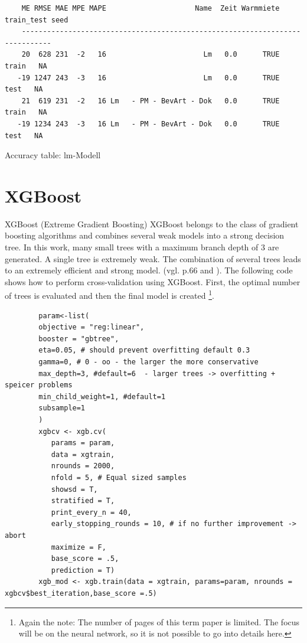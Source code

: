 	\begin{table}[H]
		\begin{verbatim}
    ME RMSE MAE MPE MAPE                     Name  Zeit Warmmiete train_test seed
    -----------------------------------------------------------------------------
    20  628 231  -2   16                       Lm   0.0      TRUE      train   NA
   -19 1247 243  -3   16                       Lm   0.0      TRUE       test   NA
    21  619 231  -2   16 Lm   - PM - BevArt - Dok   0.0      TRUE      train   NA
   -19 1234 243  -3   16 Lm   - PM - BevArt - Dok   0.0      TRUE       test   NA	
		\end{verbatim}
	\caption{Accuracy table: lm-Modell}
	\label{tbl: lm-Modell}
	\end{table}
	
	\section{XGBoost} \label{subsec: xg}
	XGBoost (Extreme Gradient Boosting) XGBoost belongs to the class of gradient boosting algorithms and combines several weak models into a strong decision tree. In this work, many small trees with a maximum branch depth of 3 are generated. A single tree is extremely weak. The combination of several trees leads to an extremely efficient and strong model.  (vgl. \cite{Data Science Solutions with Python} p.66 and \cite{XG}	).
	The following code shows how to perform cross-validation using XGBoost. First, the optimal number of trees is evaluated and then the final model is created \footnote{Again the note: The number of pages of this term paper is limited. The focus will be on the neural network, so it is not possible to go into details here.}.	
	
	\begin{verbatim}
		param<-list(
		objective = "reg:linear",
		booster = "gbtree",
		eta=0.05, # should prevent overfitting default 0.3
		gamma=0, # 0 - oo - the larger the more conservative  
		max_depth=3, #default=6  - larger trees -> overfitting + speicer problems
		min_child_weight=1, #default=1
		subsample=1
		)
		xgbcv <- xgb.cv( 
		   params = param, 
		   data = xgtrain, 
		   nrounds = 2000, 
		   nfold = 5, # Equal sized samples
		   showsd = T, 
		   stratified = T, 
		   print_every_n = 40,
		   early_stopping_rounds = 10, # if no further improvement -> abort
		   maximize = F, 
		   base_score = .5,
		   prediction = T)
		xgb_mod <- xgb.train(data = xgtrain, params=param, nrounds = xgbcv$best_iteration,base_score =.5)
	\end{verbatim}

